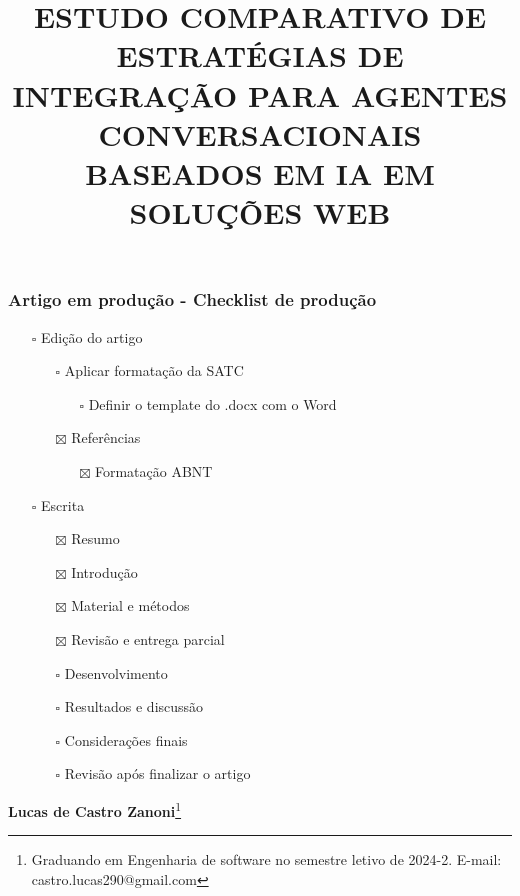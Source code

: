 \documentclass[
]{article}
\title{\textbf{ESTUDO COMPARATIVO DE ESTRATÉGIAS DE INTEGRAÇÃO PARA
AGENTES CONVERSACIONAIS BASEADOS EM IA EM SOLUÇÕES WEB}}
\author{}
\date{}
\providecommand{\tightlist}{%
  \setlength{\itemsep}{0pt}\setlength{\parskip}{0pt}}
\begin{document}
\maketitle

\subsubsection{Artigo em produção - Checklist de
produção}\label{artigo-em-produuxe7uxe3o---checklist-de-produuxe7uxe3o}

\begin{itemize}
\tightlist
\item[$\square$]
  Edição do artigo

  \begin{itemize}
  \tightlist
  \item[$\square$]
    Aplicar formatação da SATC

    \begin{itemize}
    \tightlist
    \item[$\square$]
      Definir o template do .docx com o Word
    \end{itemize}
  \item[$\boxtimes$]
    Referências

    \begin{itemize}
    \tightlist
    \item[$\boxtimes$]
      Formatação ABNT
    \end{itemize}
  \end{itemize}
\item[$\square$]
  Escrita

  \begin{itemize}
  \tightlist
  \item[$\boxtimes$]
    Resumo
  \item[$\boxtimes$]
    Introdução
  \item[$\boxtimes$]
    Material e métodos
  \item[$\boxtimes$]
    Revisão e entrega parcial
  \item[$\square$]
    Desenvolvimento
  \item[$\square$]
    Resultados e discussão
  \item[$\square$]
    Considerações finais
  \item[$\square$]
    Revisão após finalizar o artigo
  \end{itemize}
\end{itemize}

\textbf{Lucas de Castro Zanoni}\footnote{Graduando em Engenharia de
  software no semestre letivo de 2024-2. E-mail:
  castro.lucas290@gmail.com}
\end{document}
